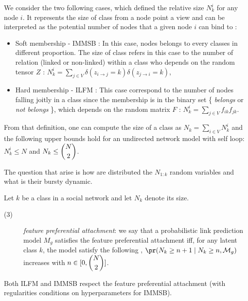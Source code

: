 We consider the two following cases, which defined the relative size $N_k^i$ for any node $i$. It represents the size of class from a node point a view and can be interpreted as the potential number of nodes that a given node $i$ can bind to :
\begin{itemize}
    \item Soft membership - IMMSB : In this case, nodes belongs to every classes in different proportion. The size of class refers in this case to the number of relation (linked or non-linked) within a class who depends on the random tensor $Z$ : $N_k^i = \sum_{j \in V} \delta(z_{i\rightarrow j}=k)\delta(z_{j\rightarrow i}=k)$,
    \item Hard membership - ILFM : This case correspond to the number of nodes falling joitly in a class since the membership is in the binary set \{ \emph{belongs} or \emph{not belongs} \}, which depends on the random matrix $F$ : $N_k^i = \sum_{j\in V} f_{ik}f_{jk}$.
\end{itemize}

From that definition, one can compute the size of a class as $N_k = \sum_{i\in V} N_k^i$ and the following upper bounds hold for an undirected network model with self loop: $N_k^i \leq N$ and $N_k \leq \dbinom{N}{2}$.

The question that arise is how are distributed the $N_{1:k}$ random variables and what is their bursty dynamic.

\begin{definition}
Let $k$ be a class in a social network and let $N_k$ denote its size. 
\begin{description}
    \item[(3)] \emph{feature preferential attachment}: we say that a probabilistic link prediction model $M_g$ satisfies the feature preferential attachment iff, for any latent class $k$, the model satisfy the following , $\pr(N_k \ge n+1 \mid N_k \ge n, \mathcal{M}_g)$ increases with $n \in [0,\dbinom{N}{2}]$.
\end{description}
\label{def:burst-soc-net2}
\end{definition}


\begin{proposition}
Both ILFM and IMMSB respect the feature preferential attachment (with regularities conditions on hyperparameters for IMMSB).	
\end{proposition}

